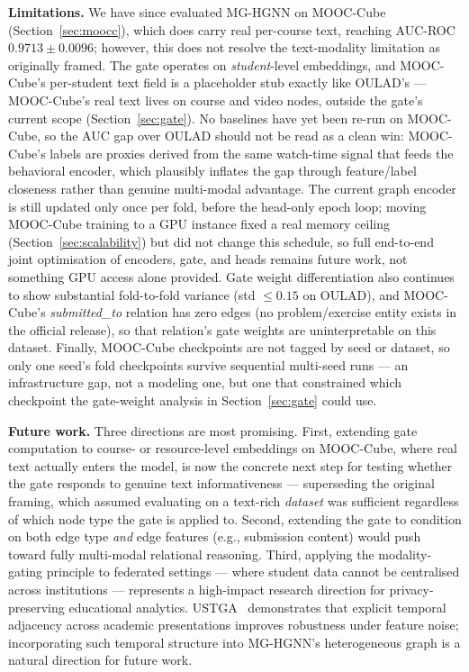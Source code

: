 \documentclass[sigconf,review]{acmart}
\begin{document}
\textbf{Limitations.}
We have since evaluated MG-HGNN on MOOC-Cube
(Section~\ref{sec:moocc}), which does carry real
per-course text, reaching AUC-ROC
$0.9713 \pm 0.0096$; however, this does not resolve
the text-modality limitation as originally framed.
The gate operates on \emph{student}-level embeddings,
and MOOC-Cube's per-student text field is a placeholder
stub exactly like OULAD's --- MOOC-Cube's real text
lives on course and video nodes, outside the gate's
current scope (Section~\ref{sec:gate}). No baselines
have yet been re-run on MOOC-Cube, so the AUC gap over
OULAD should not be read as a clean win: MOOC-Cube's
labels are proxies derived from the same watch-time
signal that feeds the behavioral encoder, which
plausibly inflates the gap through feature/label
closeness rather than genuine multi-modal advantage.
The current graph encoder is still updated only once
per fold, before the head-only epoch loop; moving
MOOC-Cube training to a GPU instance fixed a real
memory ceiling (Section~\ref{sec:scalability}) but did
not change this schedule, so full end-to-end joint
optimisation of encoders, gate, and heads remains
future work, not something GPU access alone provided.
Gate weight differentiation also continues to show
substantial fold-to-fold variance (std $\leq 0.15$ on
OULAD), and MOOC-Cube's \textit{submitted\_to}
relation has zero edges (no problem/exercise entity
exists in the official release), so that relation's
gate weights are uninterpretable on this dataset.
Finally, MOOC-Cube checkpoints are not tagged by seed
or dataset, so only one seed's fold checkpoints survive
sequential multi-seed runs --- an infrastructure gap,
not a modeling one, but one that constrained which
checkpoint the gate-weight analysis in
Section~\ref{sec:gate} could use.

\textbf{Future work.}
Three directions are most promising. First, extending
gate computation to course- or resource-level
embeddings on MOOC-Cube, where real text actually
enters the model, is now the concrete next step for
testing whether the gate responds to genuine text
informativeness --- superseding the original framing,
which assumed evaluating on a text-rich \emph{dataset}
was sufficient regardless of which node type the gate
is applied to. Second, extending the gate to condition
on both edge type \emph{and} edge features (e.g.,
submission content) would push toward fully multi-modal
relational reasoning. Third, applying the
modality-gating principle to federated settings ---
where student data cannot be centralised across
institutions --- represents a high-impact research
direction for privacy-preserving educational analytics.
USTGA~\citep{yu2026ustga} demonstrates that
explicit temporal adjacency across academic
presentations improves robustness under
feature noise; incorporating such temporal
structure into MG-HGNN's heterogeneous graph
is a natural direction for future work.
\end{document}
